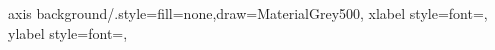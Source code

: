 axis background/.style={fill=none,draw=MaterialGrey500},
xlabel style={font=\color{white!15!black}},
ylabel style={font=\color{white!15!black}},